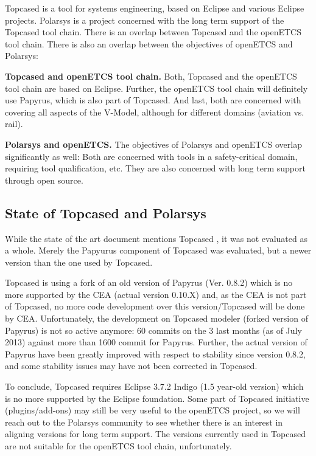 Topcased is a tool for systems engineering, based on Eclipse and various Eclipse projects.  Polarsys is a project concerned with the long term support of the Topcased tool chain.  There is an overlap between Topcased and the openETCS tool chain.  There is also an overlap between the objectives of openETCS and Polarsys:

\textbf{Topcased and openETCS tool chain.} Both, Topcased and the openETCS tool chain are based on Eclipse.  Further, the openETCS tool chain will definitely use Papyrus, which is also part of Topcased.  And last, both are concerned with covering all aspects of the V-Model, although for different domains (aviation vs. rail).

\textbf{Polarsys and openETCS.}  The objectives of Polarsys and openETCS overlap significantly as well: Both are concerned with tools in a safety-critical domain, requiring tool qualification, etc.  They are also concerned with long term support through open source.

\subsection{State of Topcased and Polarsys}

While the state of the art document mentions Topcased \cite{}, it was not evaluated as a whole.  Merely the Papyurus component of Topcased was evaluated, but a newer version than the one used by Topcased.

Topcased is using a fork of an old version of Papyrus (Ver. 0.8.2) which is no more supported by the CEA (actual version 0.10.X) and, as the CEA is not part of Topcased, no more code development over this version/Topcased will be done by CEA.  Unfortunately, the development on Topcased modeler (forked version of Papyrus) is not so active anymore: 60 commits on the 3 last months (as of July 2013) against more than 1600 commit for Papyrus.  Further, the actual version of Papyrus have been greatly improved with respect to stability since version 0.8.2, and some stability issues may have not been corrected in Topcased.

To conclude, Topcased requires Eclipse 3.7.2 Indigo (1.5 year-old version) which is no more supported by the Eclipse foundation.  Some part of Topcased initiative (plugins/add-ons) may still be very useful to the openETCS project, so we will reach out to the Polarsys community to see whether there is an interest in aligning versions for long term support.  The versions currently used in Topcased are not suitable for the openETCS tool chain, unfortunately.

